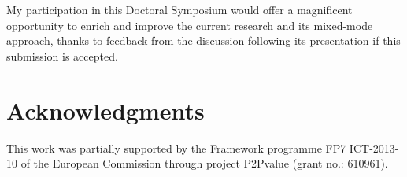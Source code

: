 \documentclass{acm_proc_article-sp}
\begin{document}
My participation in this Doctoral Symposium would offer a magnificent opportunity to enrich and improve the current research and its mixed-mode approach, thanks to  feedback from the discussion following its presentation if this submission is accepted.


\section{Acknowledgments}
This work was partially supported by the Framework
programme FP7 ICT-2013-10 of the European Commission through project
P2Pvalue (grant no.: 610961).



\end{document}

